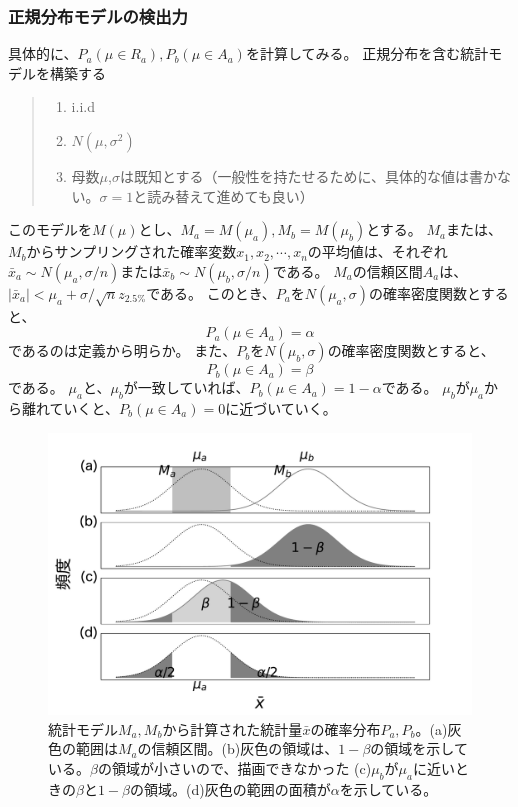 \subsubsection{正規分布モデルの検出力}
具体的に、$P_a(\mu \in R_a),P_b(\mu\in A_a)$を計算してみる。
正規分布を含む統計モデルを構築する
\begin{quote}
    \begin{enumerate}[(1)]
\item i.i.d
\item $N(\mu,\sigma^2)$
\item 母数$\mu$,$\sigma$は既知とする（一般性を持たせるために、具体的な値は書かない。$\sigma=1$と読み替えて進めても良い）
\end{enumerate}
\end{quote}
このモデルを$M(\mu)$とし、$M_a=M(\mu_a),M_b=M(\mu_b)$とする。
$M_a$または、$M_b$からサンプリングされた確率変数$x_1,x_2,\cdots,x_n$の平均値は、それぞれ$\bar{x}_a\sim N(\mu_a,\sigma/n)$または$\bar{x}_b\sim N(\mu_b,\sigma/n)$である。
$M_a$の信頼区間$A_a$は、$|\bar{x}_a|<\mu_a+\sigma / \sqrt{n}z_{2.5\%}$である。
このとき、$P_a$を$N(\mu_a,\sigma)$の確率密度関数とすると、
\begin{equation*}
    P_a(\mu \in A_a) = \alpha
\end{equation*}
であるのは定義から明らか。
また、$P_b$を$N(\mu_b,\sigma)$の確率密度関数とすると、
\begin{equation*}
    P_b(\mu \in A_a ) = \beta
\end{equation*}
である。
$\mu_a$と、$\mu_b$が一致していれば、$P_b(\mu \in A_a ) = 1-\alpha$である。
$\mu_b$が$\mu_a$から離れていくと、$P_b(\mu \in A_a)=0$に近づいていく。


\begin{figure}
\begin{center}
    \includegraphics[width=15cm]{./image/04_/power_of_a_test_2.pdf}
    \caption{統計モデル$M_a,M_b$から計算された統計量$\bar{x}$の確率分布$P_a,P_b$。(a)灰色の範囲は$M_a$の信頼区間。(b)灰色の領域は、$1-\beta$の領域を示している。$\beta$の領域が小さいので、描画できなかった (c)$\mu_b$が$\mu_a$に近いときの$\beta$と$1-\beta$の領域。(d)灰色の範囲の面積が$\alpha$を示している。}
    \label{fig:power_of_test_alpha_beta}
\end{center}
\end{figure}



